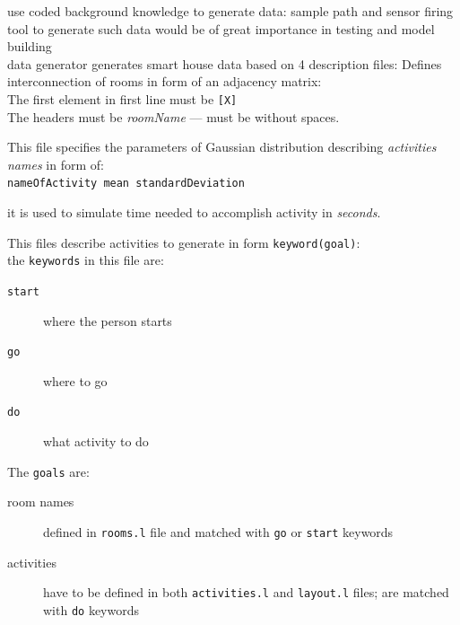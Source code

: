 \documentclass[12pt, a4paper, pdflatex, leqno, twoside, openright]{report}
\begin{document}
use coded background knowledge to generate data: sample path and sensor firing\\
tool to generate such data would be of great importance in testing and model building\\

data generator generates smart house data based on 4 description files:
Defines interconnection of rooms in form of an adjacency matrix:\\
% 

The first element in first line must be \texttt{[X]}\\
The headers must be \emph{roomName} --- must be without spaces.

This file specifies the parameters of Gaussian distribution describing \emph{activities names} in form of:\\
\texttt{nameOfActivity mean standardDeviation}

it is used to simulate time needed to accomplish activity in \emph{seconds}.

% 

This files describe activities to generate in form \texttt{keyword(goal)}:\\
% 

the \texttt{keywords} in this file are:\\
\begin{description}
\item[\texttt{start}] where the person starts
\item[\texttt{go}] where to go
\item[\texttt{do}] what activity to do
\end{description}

The \texttt{goals} are:
\begin{description}
\item[room names] defined in \texttt{rooms.l} file and matched with \texttt{go} or \texttt{start} keywords

\item[activities] have to be defined in both \texttt{activities.l} and \texttt{layout.l} files; are matched with \texttt{do} keywords
\end{description}
\end{document}

